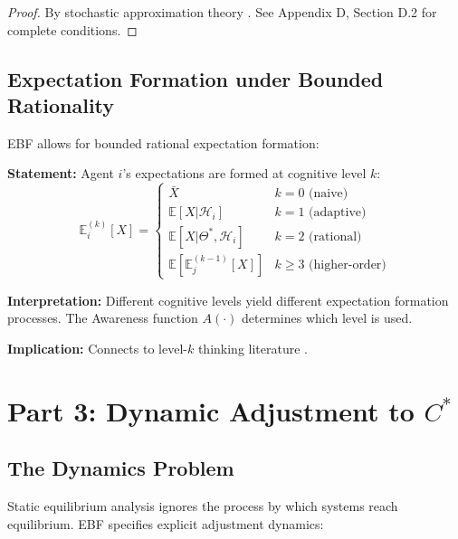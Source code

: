 \begin{proof}
By stochastic approximation theory \citep{benveniste1990adaptive}.
See Appendix D, Section D.2 for complete conditions.
\end{proof}

\subsection{Expectation Formation under Bounded Rationality}

EBF allows for bounded rational expectation formation:

\begin{tcolorbox}[colback=gray!5!white, colframe=gray!75!black,
    title=Axiom AZ-L2: Hierarchical Expectations]
\textbf{Statement:} Agent $i$'s expectations are formed at cognitive level $k$:
\begin{equation}
\mathbb{E}^{(k)}_i[X] = \begin{cases}
\bar{X} & k = 0 \text{ (naive)} \\
\mathbb{E}[X | \mathcal{H}_i] & k = 1 \text{ (adaptive)} \\
\mathbb{E}[X | \Theta^*, \mathcal{H}_i] & k = 2 \text{ (rational)} \\
\mathbb{E}[\mathbb{E}^{(k-1)}_j[X]] & k \geq 3 \text{ (higher-order)}
\end{cases}
\end{equation}

\textbf{Interpretation:} Different cognitive levels yield different expectation
formation processes. The Awareness function $A(\cdot)$ determines which level is used.

\textbf{Implication:} Connects to level-$k$ thinking literature \citep{stahl1995players,
nagel1995unraveling}.
\end{tcolorbox}


\section{Part 3: Dynamic Adjustment to $C^*$}
\label{sec:az-dynamics}

\subsection{The Dynamics Problem}

Static equilibrium analysis ignores the process by which systems reach equilibrium.
EBF specifies explicit adjustment dynamics:

